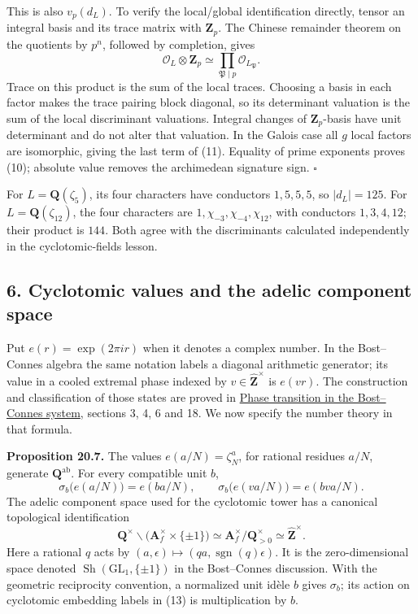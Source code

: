 \documentclass[11pt,a4paper]{article}
\begin{document}
This is also \(v_p(d_L)\). To verify the local/global identification
directly, tensor an integral basis and its trace matrix with
\(\mathbf Z_p\). The Chinese remainder theorem on the quotients by
\(p^n\), followed by completion, gives \[
\mathcal O_L\otimes\mathbf Z_p\simeq
\prod_{\mathfrak P\mid p}\mathcal O_{L_{\mathfrak P}}.
\] Trace on this product is the sum of the local traces. Choosing a
basis in each factor makes the trace pairing block diagonal, so its
determinant valuation is the sum of the local discriminant valuations.
Integral changes of \(\mathbf Z_p\)-basis have unit determinant and do
not alter that valuation. In the Galois case all \(g\) local factors are
isomorphic, giving the last term of (11). Equality of prime exponents
proves (10); absolute value removes the archimedean signature sign.
\(\square\)

For \(L=\mathbf Q(\zeta_5)\), its four characters have conductors
\(1,5,5,5\), so \(|d_L|=125\). For \(L=\mathbf Q(\zeta_{12})\), the four
characters are \(1,\chi_{-3},\chi_{-4},\chi_{12}\), with conductors
\(1,3,4,12\); their product is \(144\). Both agree with the
discriminants calculated independently in the cyclotomic-fields lesson.

\subsection{6. Cyclotomic values and the adelic component
space}\label{cyclotomic-values-and-the-adelic-component-space}

Put \(e(r)=\exp(2\pi ir)\) when it denotes a complex number. In the
Bost--Connes algebra the same notation labels a diagonal arithmetic
generator; its value in a cooled extremal phase indexed by
\(v\in\widehat{\mathbf Z}^{\times}\) is \(e(vr)\). The construction and
classification of those states are proved in
\href{https://kokunoyumeto.github.io/open-math-courses/courses/NT-CFT/proof-dependencies.html\#QSM-L04}{Phase
transition in the Bost--Connes system}, sections 3, 4, 6 and 18. We now
specify the number theory in that formula.

\textbf{Proposition 20.7.} The values \(e(a/N)=\zeta_N^a\), for rational
residues \(a/N\), generate \(\mathbf Q^{\mathrm{ab}}\). For every
compatible unit \(b\), \[
\sigma_b\bigl(e(a/N)\bigr)=e(ba/N),\qquad
\sigma_b\bigl(e(va/N)\bigr)=e(bva/N).
\tag{12}
\] The adelic component space used for the cyclotomic tower has a
canonical topological identification \[
\mathbf Q^\times\backslash
\bigl(\mathbf A_f^\times\times\{\pm1\}\bigr)
\simeq \mathbf A_f^\times/\mathbf Q_{>0}^\times
\simeq\widehat{\mathbf Z}^{\times}.
\tag{13}
\] Here a rational \(q\) acts by
\((a,\epsilon)\mapsto(qa,\operatorname{sgn}(q)\epsilon)\). It is the
zero-dimensional space denoted
\(\operatorname{Sh}(\mathrm{GL}_1,\{\pm1\})\) in the Bost--Connes
discussion. With the geometric reciprocity convention, a normalized unit
idèle \(b\) gives \(\sigma_b\); its action on cyclotomic embedding
labels in (13) is multiplication by \(b\).
\end{document}
